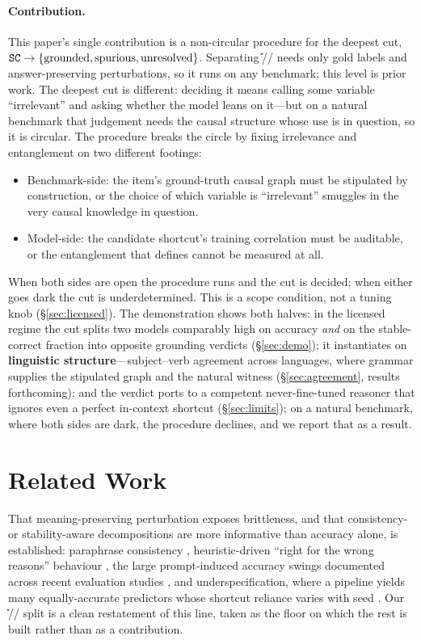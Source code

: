 \paragraph{Contribution.}
This paper's single contribution is a non-circular procedure for the deepest
cut, $\texttt{SC} \rightarrow \{\text{grounded},\text{spurious},\text{unresolved}\}$.
Separating
\U{}/\SW{}/\SC{} needs only gold labels and answer-preserving perturbations, so
it runs on any benchmark; this level is prior work. The deepest cut is
different: deciding it means calling some variable ``irrelevant'' and asking
whether the model leans on it---but on a natural benchmark that judgement needs
the causal structure whose use is in question, so it is circular. The procedure
breaks the circle by fixing irrelevance and entanglement on two different
footings:
\begin{itemize}\itemsep2pt
  \item Benchmark-side: the item's ground-truth causal graph must be
  stipulated by construction, or the choice of which variable is
  ``irrelevant'' smuggles in the very causal knowledge in question.
  \item Model-side: the candidate shortcut's training
  correlation must be auditable, or the entanglement that defines \scs{} cannot
  be measured at all.
\end{itemize}
When both sides are open the procedure runs and the cut is decided; when either
goes dark the cut is underdetermined. This is a scope condition, not a
tuning knob (\S\ref{sec:licensed}). The demonstration shows both halves: in the
licensed regime the cut splits two models comparably high on accuracy
\emph{and} on the stable-correct fraction into opposite grounding verdicts
(\S\ref{sec:demo}); it instantiates on \textbf{linguistic structure}---subject--verb
agreement across languages, where grammar supplies the stipulated graph and the
natural \scg{} witness (\S\ref{sec:agreement}, results forthcoming); and the verdict
ports to a competent never-fine-tuned reasoner that ignores even a perfect
in-context shortcut (\S\ref{sec:limits}); on a natural benchmark, where both
sides are dark, the procedure declines, and we report that as a result.

\section{Related Work}\label{sec:related}
That meaning-preserving perturbation exposes brittleness, and that consistency-
or stability-aware decompositions are more informative than accuracy alone, is
established: paraphrase consistency \citep{elazar2021consistency},
heuristic-driven ``right for the wrong reasons'' behaviour
\citep{mccoy2019right}, the large prompt-induced accuracy swings documented
across recent evaluation studies
\citep{zhuo2024prosa,errica2025wrong,hua2025flaw}, and underspecification, where
a pipeline yields many equally-accurate predictors whose shortcut reliance
varies with seed \citep{damour2022underspecification}. Our \U{}/\SW{}/\SC{}
split is a clean restatement of this line, taken as the floor on which the rest
is built rather than as a contribution.

